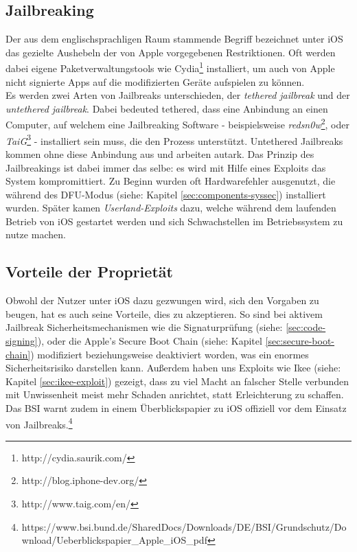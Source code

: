	\subsection{Jailbreaking}\label{sec:jailbreaking}
		Der aus dem englischsprachligen Raum stammende Begriff bezeichnet unter iOS
		das gezielte Aushebeln der von Apple vorgegebenen Restriktionen. Oft werden
		dabei eigene Paketverwaltungstools wie
		Cydia\footnote{http://cydia.saurik.com/} installiert, um auch von Apple nicht
		signierte Apps auf die modifizierten Geräte aufspielen zu können.\\
		Es werden zwei Arten von Jailbreaks unterschieden, der \textsl{tethered
		jailbreak} und der \textsl{untethered jailbreak}. Dabei bedeuted tethered,
		dass eine Anbindung an einen Computer, auf welchem eine Jailbreaking Software
		- beispielsweise \textsl{redsn0w}\footnote{http://blog.iphone-dev.org/}, oder
		\textsl{TaiG}\footnote{http://www.taig.com/en/} - installiert sein muss, die
		den Prozess unterstützt.
		Untethered Jailbreaks kommen ohne diese Anbindung aus und arbeiten autark.
		Das Prinzip des Jailbreakings ist dabei immer das selbe: es wird mit
		Hilfe eines Exploits das System kompromittiert. Zu Beginn wurden oft
		Hardwarefehler ausgenutzt, die während des
		DFU-Modus (siehe: Kapitel \ref{sec:components-syssec}) installiert wurden.
		Später kamen \textsl{Userland-Exploits} dazu, welche während dem
		laufenden Betrieb von iOS gestartet werden und sich Schwachstellen im
		Betriebssystem zu nutze machen.
	
	\subsection{Vorteile der Proprietät}
		Obwohl der Nutzer unter iOS dazu gezwungen wird, sich den Vorgaben zu beugen,
		hat es auch seine Vorteile, dies zu akzeptieren. So sind bei aktivem Jailbreak
		Sicherheitsmechanismen wie die Signaturprüfung (siehe:
		\ref{sec:code-signing}), oder die Apple's Secure Boot
		Chain (siehe: Kapitel \ref{sec:secure-boot-chain}) modifiziert beziehungsweise
		deaktiviert worden, was ein enormes Sicherheitsrisiko darstellen kann.
		Außerdem haben uns Exploits wie Ikee (siehe: Kapitel \ref{sec:ikee-exploit})
		gezeigt, dass zu viel Macht an falscher Stelle verbunden mit Unwissenheit meist mehr
		Schaden anrichtet, statt Erleichterung zu schaffen.
		Das BSI warnt zudem in einem Überblickspapier zu iOS offiziell vor dem Einsatz
		von Jailbreaks.\footnote{https://www.bsi.bund.de/SharedDocs/Downloads/DE/BSI/Grundschutz/Download/Ueberblickspapier\_Apple\_iOS\_pdf}
